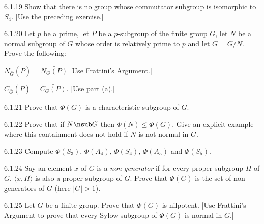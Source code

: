 \begin{exercise}{6.1.19}
    Show that there is no group whose commutator subgroup is isomorphic to $S_4$.
    [Use the preceding exercise.]
\end{exercise}

\begin{exercise}{6.1.20}
    Let $p$ be a prime, let $P$ be a $p$-subgroup of the finite group $G$, let $N$ be a normal subgroup of $G$ whose order is relatively prime to $p$ and let $\bar{G} = G/N$.
    Prove the following:
    \begin{subexercises}
        \item $N_{\bar{G}}(\bar{P}) = \bar{N_G(P)}$ [Use Frattini's Argument.]
        \item $C_{\bar{G}}(\bar{P}) = \bar{C_G(P)}$. [Use part (a).]
    \end{subexercises}
\end{exercise}

\begin{exercise}{6.1.21}
    Prove that $\Phi(G)$ is a characteristic subgroup of $G$.
\end{exercise}

\begin{exercise}{6.1.22}
    Prove that if $N \nsub G$ then $\Phi(N) \leq \Phi(G)$.
    Give an explicit example where this containment does not hold if $N$ is not normal in $G$.
\end{exercise}

\begin{exercise}{6.1.23}
    Compute $\Phi(S_3)$, $\Phi(A_4)$, $\Phi(S_4)$, $\Phi(A_5)$ and $\Phi(S_5)$.
\end{exercise}

\begin{exercise}{6.1.24}
    Say an element $x$ of $G$ is a \emph{non-generator} if for every proper subgroup $H$ of $G$, $\langle x, H \rangle$ is also a proper subgroup of $G$.
    Prove that $\Phi(G)$ is the set of non-generators of $G$ (here $|G| > 1$).
\end{exercise}

\begin{exercise}{6.1.25}
    Let $G$ be a finite group.
    Prove that $\Phi(G)$ is nilpotent.
    [Use Frattini's Argument to prove that every Sylow subgroup of $\Phi(G)$ is normal in $G$.]
\end{exercise}

